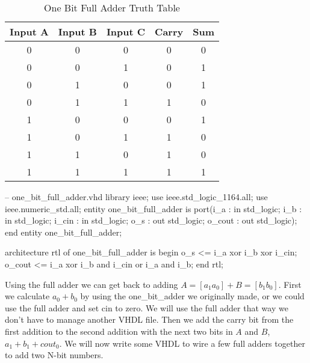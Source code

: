 \begin{table}[h!]  
\begin{center}    
\caption{One Bit Full Adder Truth Table} 
\label{tab:tt2bfa} 
\begin{tabular}{|c|c|c||c|c|}  
\textbf{Input A} & \textbf{Input B} & \textbf{Input C} & \textbf{Carry} & \textbf{Sum}\\  
\hline  
0 & 0 & 0 & 0 & 0\\  
0 & 0 & 1 & 0 & 1\\  
0 & 1 & 0 & 0 & 1\\  
0 & 1 & 1 & 1 & 0\\  
1 & 0 & 0 & 0 & 1\\  
1 & 0 & 1 & 1 & 0\\  
1 & 1 & 0 & 1 & 0\\  
1 & 1 & 1 & 1 & 1\\ 
\end{tabular}  
\end{center}
\end{table}

\begin{VHDLlisting}[tabsize=8]
-- one_bit_full_adder.vhd
library ieee; 
	use ieee.std_logic_1164.all; 
	use ieee.numeric_std.all; 
entity one_bit_full_adder is
port(i_a    : in    std_logic;  
	 i_b    : in    std_logic;  
	 i_cin  : in    std_logic;  
	 o_s    :   out std_logic;  
	 o_cout :   out std_logic);
end entity one_bit_full_adder;

architecture rtl of one_bit_full_adder is
begin 
	o_s <= i_a xor i_b xor i_cin; 
	o_cout <= i_a xor i_b and i_cin or i_a and i_b;
end rtl;
\end{VHDLlisting}

Using the full adder we can get back to adding $A=[a_1 a_0] + B=[b_1 b_0]$. First we calculate $a_0 + b_0$ by using the one\_bit\_adder we originally made, or we could use the full adder and set cin to zero. We will use the full adder that way we don't have to manage another \ac{VHDL} file. Then we add the carry bit from the first addition to the second addition with the next two bits in $A$ and $B$, $a_1 + b_1 + cout_0$. We will now write some \ac{VHDL} to wire a few full adders together to add two N-bit numbers.  

